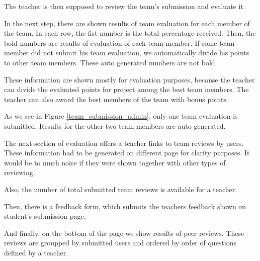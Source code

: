 The teacher is then supposed to review the team's submission and evaluate it. 

In the next step, there are shown results of team evaluation for each member of the team. In each row, the fist number is the total percentage received. Then, the bold numbers are results of evaluation of each team member. If some team member did not submit his team evaluation, we automatically divide his points to other team members. These auto generated numbers are not bold.

These information are shown mostly for evaluation purposes, because the teacher can divide the evaluated points for project among the best team members. The teacher can also award the best members of the team with bonus points.

As we see in Figure \ref{team_submission_admin}, only one team evaluation is submitted. Results for the other two team members are auto generated.

The next section of evaluation offers a teacher links to team reviews by users. These information had to be generated on different page for clarity purposes. It would be to much noise if they were shown together with other types of reviewing.

Also, the number of total submitted team reviews is available for a teacher.

Then, there is a feedback form, which submits the teachers feedback shown on student's submission page.

And finally, on the bottom of the page we show results of peer reviews. These reviews are groupped by submitted users and ordered by order of questions defined by a teacher.
